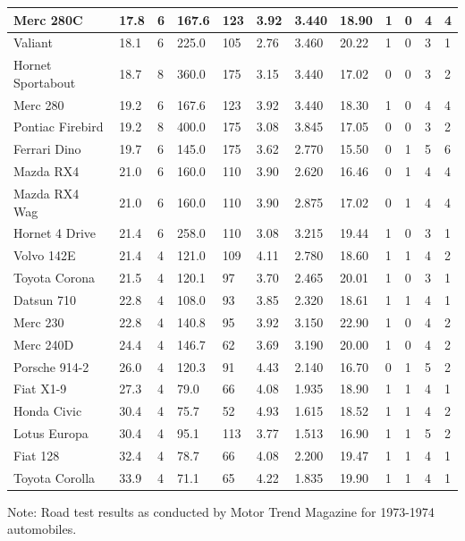 \documentclass[]{book}
\theoremstyle{definition}
\theoremstyle{definition}
\theoremstyle{remark}
\begin{document}
\begin{tabular}{l|l|l|l|l|l|l|l|l|l|l|l}
\hline
Merc 280C & 17.8 & 6 & 167.6 & 123 & 3.92 & 3.440 & 18.90 & 1 & 0 & 4 & 4\\
\hline
Valiant & 18.1 & 6 & 225.0 & 105 & 2.76 & 3.460 & 20.22 & 1 & 0 & 3 & 1\\
\hline
Hornet Sportabout & 18.7 & 8 & 360.0 & 175 & 3.15 & 3.440 & 17.02 & 0 & 0 & 3 & 2\\
\hline
Merc 280 & 19.2 & 6 & 167.6 & 123 & 3.92 & 3.440 & 18.30 & 1 & 0 & 4 & 4\\
\hline
Pontiac Firebird & 19.2 & 8 & 400.0 & 175 & 3.08 & 3.845 & 17.05 & 0 & 0 & 3 & 2\\
\hline
Ferrari Dino & 19.7 & 6 & 145.0 & 175 & 3.62 & 2.770 & 15.50 & 0 & 1 & 5 & 6\\
\hline
Mazda RX4 & 21.0 & 6 & 160.0 & 110 & 3.90 & 2.620 & 16.46 & 0 & 1 & 4 & 4\\
\hline
Mazda RX4 Wag & 21.0 & 6 & 160.0 & 110 & 3.90 & 2.875 & 17.02 & 0 & 1 & 4 & 4\\
\hline
Hornet 4 Drive & 21.4 & 6 & 258.0 & 110 & 3.08 & 3.215 & 19.44 & 1 & 0 & 3 & 1\\
\hline
Volvo 142E & 21.4 & 4 & 121.0 & 109 & 4.11 & 2.780 & 18.60 & 1 & 1 & 4 & 2\\
\hline
Toyota Corona & 21.5 & 4 & 120.1 & 97 & 3.70 & 2.465 & 20.01 & 1 & 0 & 3 & 1\\
\hline
Datsun 710 & 22.8 & 4 & 108.0 & 93 & 3.85 & 2.320 & 18.61 & 1 & 1 & 4 & 1\\
\hline
Merc 230 & 22.8 & 4 & 140.8 & 95 & 3.92 & 3.150 & 22.90 & 1 & 0 & 4 & 2\\
\hline
Merc 240D & 24.4 & 4 & 146.7 & 62 & 3.69 & 3.190 & 20.00 & 1 & 0 & 4 & 2\\
\hline
Porsche 914-2 & 26.0 & 4 & 120.3 & 91 & 4.43 & 2.140 & 16.70 & 0 & 1 & 5 & 2\\
\hline
Fiat X1-9 & 27.3 & 4 & 79.0 & 66 & 4.08 & 1.935 & 18.90 & 1 & 1 & 4 & 1\\
\hline
Honda Civic & 30.4 & 4 & 75.7 & 52 & 4.93 & 1.615 & 18.52 & 1 & 1 & 4 & 2\\
\hline
Lotus Europa & 30.4 & 4 & 95.1 & 113 & 3.77 & 1.513 & 16.90 & 1 & 1 & 5 & 2\\
\hline
Fiat 128 & 32.4 & 4 & 78.7 & 66 & 4.08 & 2.200 & 19.47 & 1 & 1 & 4 & 1\\
\hline
Toyota Corolla & 33.9 & 4 & 71.1 & 65 & 4.22 & 1.835 & 19.90 & 1 & 1 & 4 & 1\\
\hline
\end{tabular}

Note: Road test results as conducted by Motor Trend Magazine for
1973-1974 automobiles.
\end{document}
